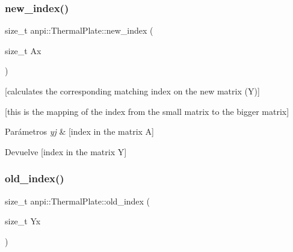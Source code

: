 \mbox{\label{classanpi_1_1ThermalPlate_a8d8872e95750a5cd5ae6e1a89b60cbd8}} 
\subsubsection{\texorpdfstring{new\+\_\+index()}{new\_index()}}
{\footnotesize\ttfamily size\+\_\+t anpi\+::\+Thermal\+Plate\+::new\+\_\+index (\begin{DoxyParamCaption}\item[{size\+\_\+t}]{Ax }\end{DoxyParamCaption})\hspace{0.3cm}{\ttfamily [inline]}}



\mbox{[}calculates the corresponding matching index on the new matrix (Y)\mbox{]} 

\mbox{[}this is the mapping of the index from the small matrix to the bigger matrix\mbox{]}


\begin{DoxyParams}{Parámetros}
{\em yj} & \mbox{[}index in the matrix A\mbox{]} \\
\hline
\end{DoxyParams}
\begin{DoxyReturn}{Devuelve}
\mbox{[}index in the matrix Y\mbox{]} 
\end{DoxyReturn}
\mbox{\label{classanpi_1_1ThermalPlate_a249cb0a0909e3d47bbdf9e65db1e6a46}} 
\subsubsection{\texorpdfstring{old\+\_\+index()}{old\_index()}}
{\footnotesize\ttfamily size\+\_\+t anpi\+::\+Thermal\+Plate\+::old\+\_\+index (\begin{DoxyParamCaption}\item[{size\+\_\+t}]{Yx }\end{DoxyParamCaption})\hspace{0.3cm}{\ttfamily [inline]}}



